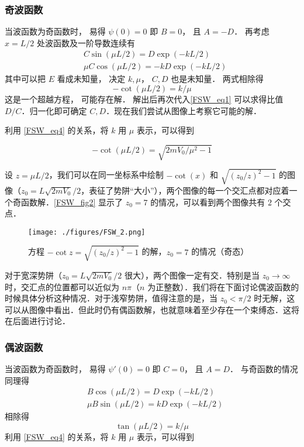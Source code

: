 \subsubsection{奇波函数}
当波函数为奇函数时， 易得 $\psi(0) = 0$ 即 $B = 0$， 且 $A = -D$． 再考虑 $x = L/2$ 处波函数及一阶导数连续有
\begin{equation}\label{FSW_eq1}
\begin{aligned}
&C\sin(\mu L/2) = D \exp(-kL/2)\\
&\mu C \cos(\mu L/2) = -kD \exp(-kL/2)
\end{aligned}
\end{equation}
其中可以把 $E$ 看成未知量， 决定 $k, \mu$， $C,D$ 也是未知量． 两式相除得
\begin{equation}\label{FSW_eq2}
-\cot(\mu L/2) = k/\mu
\end{equation}
这是一个超越方程， 可能存在解． 解出后再次代入\autoref{FSW_eq1} 可以求得比值 $D/C$．归一化即可确定 $C, D$．现在我们尝试从图像上考察它可能的解．

利用 \autoref{FSW_eq4} 的关系，将 $k$ 用 $\mu$ 表示，可以得到

\begin{equation}\label{FSW_eq5}
-\cot(\mu L/2)=\sqrt{2mV_0/\mu^2-1}
\end{equation}

设 $z=\mu L/2$，我们可以在同一坐标系中绘制 $-\cot(x)$ 和 $\sqrt{(z_0/z)^2-1}$ 的图像（$z_0=L\sqrt{2mV_0}/2$，表征了势阱“大小”），两个图像的每一个交汇点都对应着一个奇函数解．\autoref{FSW_fig2} 显示了 $z_0=7$ 的情况，可以看到两个图像共有 $2$ 个交点．

\begin{figure}[ht]
\centering
\texttt{[image: ./figures/FSW\_2.png]}
\caption{方程 $-\cot z=\sqrt{(z_0/z)^2-1}$ 的解，$z_0=7$ 的情况（奇态）} \label{FSW_fig2}
\end{figure}

对于宽深势阱（$z_0=L\sqrt{2mV_0}/2$ 很大），两个图像一定有交．特别是当 $z_0\rightarrow\infty$ 时，交汇点的位置都可以近似为 $n\pi$（$n$ 为正整数）．我们将在下面讨论偶波函数的时候具体分析这种情况．对于浅窄势阱，值得注意的是，当 $z_0<\pi/2$ 时无解，这可以从图像中看出．但此时仍有偶函数解，也就意味着至少存在一个束缚态．这将在后面进行讨论．

\subsubsection{偶波函数}
当波函数为奇函数时， 易得 $\psi'(0) = 0$ 即 $C = 0$， 且 $A = D$． 与奇函数的情况同理得
\begin{equation}
\begin{aligned}
&B\cos(\mu L/2) = D \exp(-kL/2)\\
&\mu B \sin(\mu L/2) = kD \exp(-kL/2)
\end{aligned}
\end{equation}
相除得
\begin{equation}\label{FSW_eq3}
\tan(\mu L/2) = k/\mu
\end{equation}
利用 \autoref{FSW_eq4} 的关系，将 $k$ 用 $\mu$ 表示，可以得到

